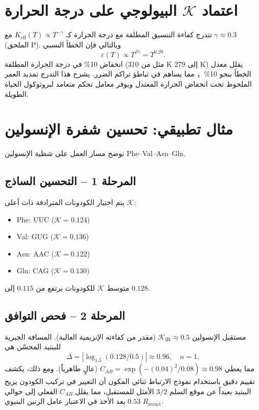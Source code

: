 \documentclass[11pt,a4paper]{article}
\newcommand{\REL}{\mathcal{K}}
\newcommand{\ABS}{K_{\mathrm{eff}}}
\begin{document}
	\section{اعتماد \(\REL\) البيولوجي على درجة الحرارة}
	\label{sec:temperature}
	تتدرج كفاءة التنسيق المطلقة مع درجة الحرارة كـ \(\ABS(T) \propto T^{-\gamma}\) مع \(\gamma \approx 0.3\) (الملحق P). وبالتالي فإن الخطأ النسبي
	\[
	\varepsilon(T) \propto T^{\beta\gamma} = T^{0.20}.
	\]
	انخفاض 10\% في درجة الحرارة المطلقة (مثل من 310 K إلى 279 K) يقلل معدل الخطأ بنحو 10\%， مما يساهم في تباطؤ تراكم الضرر. يشرح هذا التدرج تمديد العمر الملحوظ تحت انخفاض الحرارة المعتدل ويوفر معامل تحكم متعامد لبروتوكول الحياة الطويلة.
	
	\section{مثال تطبيقي: تحسين شفرة الإنسولين}
	\label{sec:insulin}
	نوضح مسار العمل على شظية الإنسولين Phe–Val–Asn–Gln.
	
	\subsection{المرحلة 1 – التحسين الساذج}
	يتم اختيار الكودونات المترادفة ذات أعلى \(\REL\):
	\begin{itemize}
		\item Phe: UUC (\(\REL=0.124\))
		\item Val: GUG (\(\REL=0.136\))
		\item Asn: AAC (\(\REL=0.122\))
		\item Gln: CAG (\(\REL=0.130\))
	\end{itemize}
	متوسط \(\REL\) للكودونات يرتفع من \(0.115\) إلى \(0.128\).
	
	\subsection{المرحلة 2 – فحص التوافق}
	مستقبل الإنسولين \(\REL_{\mathrm{IR}} \approx 0.5\) (مقدر من كفاءته الإنزيمية العالية). المسافة الجبرية للببتيد المحسّن هي
	\[
	\Delta = |\log_{1.5}(0.128/0.5)| \approx 0.96,\quad n=1,
	\]
	مما يعطي \(C_{AB} = \exp(-(0.04)^2/0.08) \approx 0.98\) (عالٍ ظاهرياً). ومع ذلك، يكشف تقييم دقيق باستخدام نموذج الارتباط ثنائي المكون أن التغيير في تركيب الكودون يزيح الببتيد بعيداً عن موقع السلم \(3/2\) الأمثل للمستقبل، مما يقلل \(C_{AB}\) الفعلي إلى حوالي \(0.53\) بعد الأخذ في الاعتبار عامل الرنين البنيوي \(R_{\mathrm{struct}}\).
	
\end{document}
